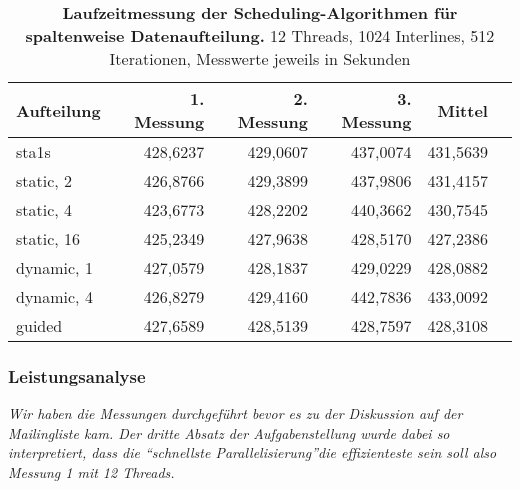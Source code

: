 \documentclass[a4paper,12pt]{scrartcl}
\begin{document}
\begin{table}[!h]
\begin{tabular}{|l|r|r|r|r|r|}
\hline
Aufteilung&1. Messung&2. Messung&3. Messung&Mittel\\
\hline
sta1s	&428,6237	&429,0607	&437,0074	&431,5639\\
\hline
static, 2	&426,8766	&429,3899	&437,9806	&431,4157\\
\hline
static, 4	&423,6773	&428,2202	&440,3662	&430,7545\\
\hline
static, 16	&425,2349	&427,9638	&428,5170	&427,2386\\
\hline
dynamic, 1	&427,0579	&428,1837	&429,0229	&428,0882\\
\hline
dynamic, 4 	&426,8279	&429,4160	&442,7836	&433,0092\\
\hline
guided	&427,6589	&428,5139	&428,7597	&428,3108\\

\hline
\end{tabular}
\caption{\textbf{Laufzeitmessung der Scheduling-Algorithmen für \\spaltenweise Datenaufteilung.} 12 Threads, 1024 Interlines, 512 \\Iterationen, Messwerte jeweils in Sekunden}
\end{table}
\vspace{5cm}
\subsubsection*{Leistungsanalyse}
\textit{Wir haben die Messungen durchgeführt bevor es zu der Diskussion auf der Mailingliste kam. Der dritte Absatz der Aufgabenstellung wurde dabei so interpretiert, dass die \textquotedblleft schnellste Parallelisierung\textquotedblright die effizienteste sein soll also Messung 1 mit 12 Threads.}
\vspace{5mm}
\end{document}
